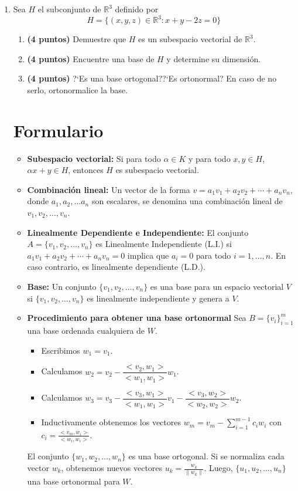\documentclass[a4paper]{article}
\begin{document}
\begin{enumerate}
\begin{enumerate}
    \end{enumerate}

    \newpage
\newpage

    \item Sea $H$ el subconjunto de $\mathbb{R}^3$ definido por
\[H=\{(x,y,z)\in\mathbb{R}^3\colon x+y-2z=0  \}\]

\begin{enumerate}
    \item {\bf (4 puntos)} Demuestre que $H$ es un subespacio vectorial de $\mathbb{R}^3$.
    \item {\bf (4 puntos)} Encuentre una base de $H$ y determine su dimensión. 
    \item {\bf (4 puntos)} ?`Es una base ortogonal??`Es ortonormal? En caso de no serlo, ortonormalice la base.
\end{enumerate}

        
        
   \newpage 

\section*{Formulario}

\begin{itemize}
    \item {\bf Subespacio vectorial: }Si para todo $\alpha \in K$ y para todo $x, y \in H$, $\alpha x+y \in H$, entonces $H$ es subespacio vectorial.
    \item {\bf Combinación lineal: } Un vector de la forma $v = a_1 v_1 + a_2v_2 + \cdots +a_n v_n$, donde $a_1, a_2, \dots a_n$ son escalares, se denomina una combinación lineal de $v_1, v_2, \dots , v_n$.
\item {\bf Linealmente Dependiente e Independiente: }El conjunto $A=\{v_1, v_2, \dots, v_n\}$ es
Linealmente Independiente (L.I.) si $ a_1 v_1 + a_2v_2 + \cdots +a_n v_n=0$ implica que $a_i=0$ para todo $i=1, \dots, n.$ En caso contrario, es linealmente dependiente (L.D.).
\item {\bf Base: } Un conjunto $\{ v_1,v_2, \dots, v_n \}$ es una base para un espacio vectorial $V$ si $\{ v_1,v_2, \dots, v_n \}$ es linealmente independiente y genera a $V$.
\item \textbf{Procedimiento para obtener una base ortonormal}
Sea $B = \{v_i\}_{i=1}^m $ una base ordenada cualquiera de $W $. 
\begin{itemize}
    \item Escribimos $w_1 = v_1$. 
    \item Calculamos $w_2=v_2-\dfrac{<v_2,w_1>}{<w_1,w_1>}w_1$.
    \item Calculamos $w_3=v_3-\dfrac{<v_3,w_1>}{<w_1,w_1>}v_1- \dfrac{<v_3,w_2>}{<w_2,w_2>}w_2$.
    \item Inductivamente obtenemos los vectores $w_m=v_m-\sum_{i=1}^{m-1}c_iw_i$ con $c_i=\frac{<v_m,w_i>}{<w_i,w_i>}$.
\end{itemize}
El conjunto $\{ w_1,w_2, \dots, w_n \}$ es una base ortogonal. Si se normaliza cada vector $w_k$, obtenemos nuevos
vectores $u_k=\frac{w_k}{\|w_k\|}$. Luego, $\{ u_1,u_2, \dots, u_n \}$ una base ortonormal para $W$.
\end{itemize}


\end{enumerate}
\end{document}
